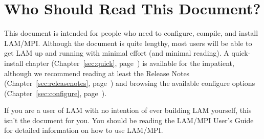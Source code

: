 %
% 
%
%

\chapter{Who Should Read This Document?}
\label{sec:audience}

This document is intended for people who need to configure, compile,
and install LAM/MPI.  Although the document is quite lengthy, most
users will be able to get LAM up and running with minimal effort (and
minimal reading).  A quick-install chapter (Chapter~\ref{sec:quick},
page~\pageref{sec:quick}) is available for the impatient, although we
recommend reading at least the Release Notes
(Chapter~\ref{sec:releasenotes}, page~\pageref{sec:releasenotes}) and
browsing the available configure options (Chapter~\ref{sec:configure},
page~\pageref{sec:configure}).

If you are a user of LAM with no intention of ever building LAM
yourself, this isn't the document for you.  You should be reading the
LAM/MPI User's Guide~\cite{lamteam03:_lam_mpi_user_guide} for
detailed information on how to use LAM/MPI.
